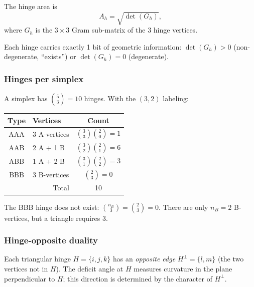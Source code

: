 The hinge area is
\begin{equation}
A_h = \sqrt{\det(G_h)},
\end{equation}
where $G_h$ is the $3 \times 3$ Gram sub-matrix of the 3 hinge vertices.

\begin{theorem}[1 hinge = 1 bit]
\label{thm:hinge_bit}
Each hinge carries exactly 1 bit of geometric information: $\det(G_h) > 0$ (non-degenerate, ``exists'') or $\det(G_h) = 0$ (degenerate).
\end{theorem}

\subsubsection{Hinges per simplex}

A simplex has $\binom{5}{3} = 10$ hinges. With the $(3,2)$ labeling:

\begin{center}
\begin{tabular}{clc}
\hline
Type & Vertices & Count \\
\hline
AAA & 3 A-vertices & $\binom{3}{3}\binom{2}{0} = 1$ \\
AAB & 2 A + 1 B & $\binom{3}{2}\binom{2}{1} = 6$ \\
ABB & 1 A + 2 B & $\binom{3}{1}\binom{2}{2} = 3$ \\
BBB & 3 B-vertices & $\binom{2}{3} = 0$ \\
\hline
\multicolumn{2}{r}{Total} & 10 \\
\hline
\end{tabular}
\end{center}

\begin{theorem}
\label{thm:bbb}
The BBB hinge does not exist: $\binom{n_B}{3} = \binom{2}{3} = 0$. There are only $n_B = 2$ B-vertices, but a triangle requires 3.
\end{theorem}

\subsubsection{Hinge-opposite duality}
\label{sec:hinge_opposite}

Each triangular hinge $H = \{i,j,k\}$ has an \emph{opposite edge} $H^\perp = \{l,m\}$ (the two vertices not in $H$).  The deficit angle at $H$ measures curvature in the plane perpendicular to $H$; this direction is determined by the character of $H^\perp$.

